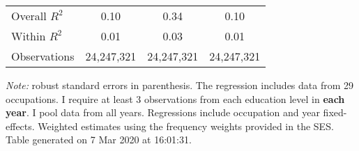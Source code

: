 \begin{center}
\begin{threeparttable}[!h]
\begin{tabular}{lccc}
\midrule Overall $ R^2$&        0.10         &        0.34         &        0.10         \\
Within $ R^2$       &        0.01         &        0.03         &        0.01         \\
Observations        &  24,247,321         &  24,247,321         &  24,247,321         \\
\bottomrule
\bottomrule
\end{tabular}
\begin{tablenotes}
\item\footnotesize\textit{Note:} robust standard errors in parenthesis. The regression includes data from 29 occupations. I require at least 3 observations from each education level in \textbf{each year}. I pool data from all years. Regressions include occupation and year fixed-effects. Weighted estimates using the frequency weights provided in the SES. Table generated on  7 Mar 2020 at 16:01:31.
\end{tablenotes}
\end{threeparttable}
\end{center}
